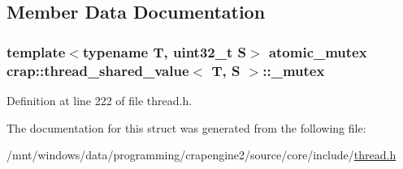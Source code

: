 \subsection{Member Data Documentation}
\hypertarget{structcrap_1_1thread__shared__value_aead78950e96504db162b4bf06628f4f5}{
\subsubsection[{\+\_\+mutex}]{\setlength{\rightskip}{0pt plus 5cm}template$<$typename T, uint32\+\_\+t S$>$ {\bf atomic\+\_\+mutex} {\bf crap\+::thread\+\_\+shared\+\_\+value}$<$ T, S $>$\+::\+\_\+mutex\hspace{0.3cm}{\ttfamily [protected]}}}\label{structcrap_1_1thread__shared__value_aead78950e96504db162b4bf06628f4f5}


Definition at line 222 of file thread.\+h.



The documentation for this struct was generated from the following file\+:\begin{DoxyCompactItemize}
\item 
/mnt/windows/data/programming/crapengine2/source/core/include/\hyperlink{thread_8h}{thread.\+h}\end{DoxyCompactItemize}

